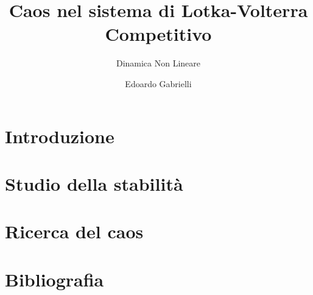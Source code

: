 \documentclass{beamer}
\title{Caos nel sistema di Lotka-Volterra Competitivo}
\subtitle[SisComp]{Dinamica Non Lineare}
\date[]{}
\author[Edoardo Gabrielli]{Edoardo Gabrielli}
\institute[Unipi]{Università di Pisa}
\begin{document}
{%
\begin{frame} %
   \titlepage  
\end{frame}}  %

\section{Introduzione} %

\section{Studio della stabilità}%

\section{Ricerca del caos}%

%
\section{Bibliografia}%

\end{document}
